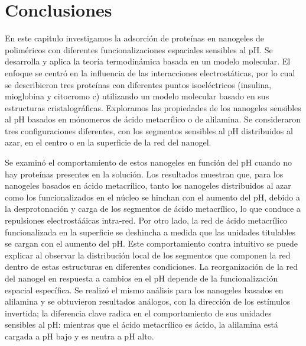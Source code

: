 \section{Conclusiones}


En este capitulo investigamos la adsorci\'on de prote\'inas en nanogeles de polim\'ericos con diferentes funcionalizaciones espaciales sensibles al pH. Se desarrolla y aplica la teor\'ia termodin\'amica basada en un modelo molecular.
El enfoque se centr\'o en la influencia de las interacciones electrost\'aticas, por lo cual se describieron tres prote\'inas con diferentes puntos isoel\'ectricos (insulina, mioglobina y citocromo c) utilizando un modelo molecular basado en sus estructuras cristalogr\'aficas.
Exploramos las propiedades de los nanogeles sensibles al pH basados en m\'onomeros de  \'acido metacrílico o de alilamina.
Se consideraron tres configuraciones diferentes, con los segmentos sensibles al pH distribuidos al azar, en el centro o en la superficie de la red del nanogel.

Se examin\'o el comportamiento de estos nanogeles en funci\'on del pH cuando no hay prote\'inas presentes en la soluci\'on.
Los resultados muestran que, para los nanogeles basados en \'acido metacr\'ilico, tanto los nanogeles distribuidos al azar como los funcionalizados en el n\'ucleo se hinchan con el aumento del pH, debido a la desprotonaci\'on y carga de los segmentos de \'acido metacr\'ilico, lo que conduce a repulsiones electrostá\'aicas intra-red.
Por otro lado, la red de \'acido metacr\'ilico funcionalizada en la superficie se deshincha a medida que las unidades titulables se cargan con el aumento del pH.
Este comportamiento contra intuitivo se puede explicar al observar la distribuci\'on local de los segmentos que componen la red dentro de estas estructuras en diferentes condiciones.
La reorganizaci\'on de la red del nanogel en respuesta a cambios en el pH depende de la funcionalizaci\'on espacial espec\'ifica.
Se realiz\'o el mismo an\'alisis para los nanogeles basados en alilamina y se obtuvieron resultados an\'alogos, con la direcci\'on de los est\'imulos invertida;
la diferencia clave radica en el comportamiento de sus unidades sensibles al pH: mientras que el \'acido metacr\'ilico es \'acido, la alilamina est\'a cargada a pH bajo y es neutra a pH alto.



